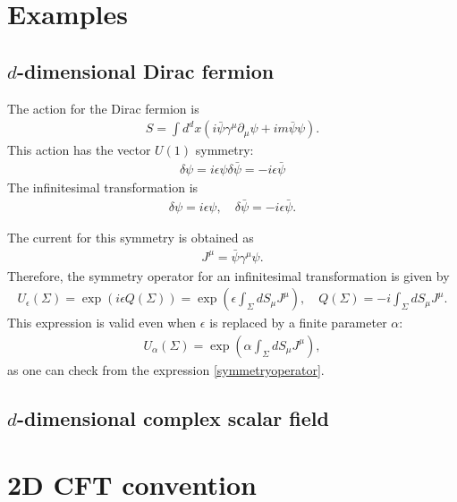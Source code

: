 \documentclass[12pt]{scrartcl}
\newcommand{\del}{\partial}
\newcommand{\psib}{\bar{\psi}}
\begin{document}
\section{Examples}
\subsection{$d$-dimensional Dirac fermion}
The action for the Dirac fermion is
\begin{align}
    S=\int d^d x \left(i \psib \gamma^{\mu}\del_{\mu}\psi+im \psib\psi\right).
\end{align}
This action has the vector $U(1)$ symmetry:
\begin{align}
    \delta \psi=i\epsilon \psi
    \delta \psib=-i\epsilon \psib
\end{align}
The infinitesimal transformation is
\begin{align}
    \delta\psi=i\epsilon\psi,\quad 
    \delta\psib=-i\epsilon\psib.
\end{align}

The current for this symmetry is obtained as
\begin{align}
    J^{\mu}=\psib \gamma^{\mu} \psi.
\end{align}
Therefore, the symmetry operator for an infinitesimal transformation is given by
\begin{align}
    U_{\epsilon}(\Sigma)=\exp\left(
        i\epsilon Q(\Sigma)
    \right)=\exp\left(
        \epsilon\int_{\Sigma}dS_{\mu}J^{\mu}
    \right),\quad
    Q(\Sigma)=-i\int_{\Sigma}dS_{\mu}J^{\mu}.
\end{align}
This expression is valid even when $\epsilon$ is replaced by a finite parameter $\alpha$:
\begin{align}
    U_{\alpha}(\Sigma)=\exp\left(
        \alpha\int_{\Sigma}dS_{\mu}J^{\mu}
    \right),
\end{align}
as one can check from the expression 
\eqref{symmetryoperator}.


\subsection{$d$-dimensional complex scalar field}


\section{2D CFT convention}


\appendix
\end{document}
